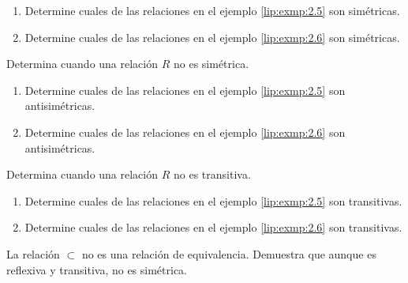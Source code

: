 \begin{problema}
	\label{lip:exmp:2.7}
	\begin{enumerate}
		\item   Determine cuales de las relaciones en el ejemplo \ref{lip:exmp:2.5} son sim\'etricas.
		\item Determine cuales de las relaciones en el ejemplo \ref{lip:exmp:2.6} son sim\'etricas.
	\end{enumerate}
	
\end{problema}


\begin{problema}
	Determina cuando una relación $R$ no es sim\'etrica.
\end{problema} 


\begin{problema}
	\label{lip:exmp:2.8}
	\begin{enumerate}
		\item   Determine cuales de las relaciones en el ejemplo \ref{lip:exmp:2.5} son antisim\'etricas.
		\item Determine cuales de las relaciones en el ejemplo \ref{lip:exmp:2.6} son antisim\'etricas.
	\end{enumerate}
	
\end{problema}


\begin{problema}
	Determina cuando una relación $R$ no es transitiva.
\end{problema}




\begin{problema}
	\label{lip:exmp:2.9}
	\begin{enumerate}
		\item   Determine cuales de las relaciones en el ejemplo \ref{lip:exmp:2.5} son transitivas.
		\item Determine cuales de las relaciones en el ejemplo \ref{lip:exmp:2.6} son transitivas.
	\end{enumerate}
	
\end{problema}



\begin{problema}
	\label{lip:exmp:2.12.b}
	La relación $\subset$ no es una relación de equivalencia. Demuestra que aunque es reflexiva y transitiva,  no es sim\'etrica. 
\end{problema}



